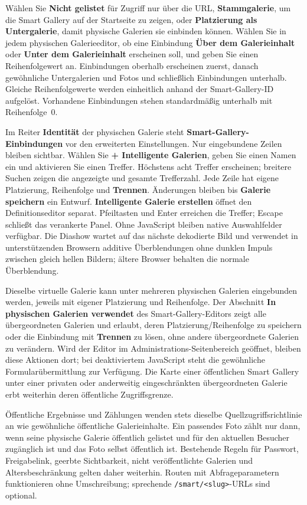 \documentclass[11pt,a4paper]{article}
\newcommand{\ui}[1]{\textbf{#1}}
\begin{document}
Wählen Sie \ui{Nicht gelistet} für Zugriff nur über die URL, \ui{Stammgalerie},
um die Smart Gallery auf der Startseite zu zeigen, oder \ui{Platzierung als
Untergalerie}, damit physische Galerien sie einbinden können. Wählen Sie in
jedem physischen Galerieeditor, ob eine Einbindung \ui{Über dem Galerieinhalt}
oder \ui{Unter dem Galerieinhalt} erscheinen soll, und geben Sie einen
Reihenfolgewert an. Einbindungen oberhalb erscheinen zuerst, danach gewöhnliche
Untergalerien und Fotos und schließlich Einbindungen unterhalb. Gleiche
Reihenfolgewerte werden einheitlich anhand der Smart-Gallery-ID aufgelöst.
Vorhandene Einbindungen stehen standardmäßig unterhalb mit Reihenfolge~0.

Im Reiter \ui{Identität} der physischen Galerie steht
\ui{Smart-Gallery-Einbindungen} vor den erweiterten Einstellungen. Nur
eingebundene Zeilen
bleiben sichtbar. Wählen Sie \ui{+ Intelligente Galerien}, geben Sie einen Namen
ein und aktivieren Sie einen Treffer. Höchstens acht Treffer erscheinen;
breitere Suchen zeigen die angezeigte und gesamte Trefferzahl. Jede Zeile hat
eigene Platzierung,
Reihenfolge und \ui{Trennen}. Änderungen bleiben bis \ui{Galerie speichern}
ein Entwurf. \ui{Intelligente Galerie erstellen} öffnet den
Definitionseditor separat. Pfeiltasten und Enter erreichen die Treffer;
Escape schließt das verankerte Panel. Ohne JavaScript bleiben native
Auswahlfelder verfügbar. Die Diashow wartet auf das nächste dekodierte Bild
und verwendet in unterstützenden Browsern additive Überblendungen ohne dunklen
Impuls zwischen gleich hellen Bildern; ältere Browser behalten die normale
Überblendung.

Dieselbe virtuelle Galerie kann unter mehreren physischen Galerien eingebunden
werden, jeweils mit eigener Platzierung und Reihenfolge. Der Abschnitt \ui{In
physischen Galerien verwendet} des Smart-Gallery-Editors zeigt alle
übergeordneten Galerien und erlaubt, deren Platzierung/Reihenfolge zu speichern
oder die Einbindung mit \ui{Trennen} zu lösen, ohne andere übergeordnete
Galerien zu verändern. Wird der Editor im Administrations-Seitenbereich
geöffnet, bleiben diese Aktionen dort; bei deaktiviertem JavaScript steht die
gewöhnliche Formularübermittlung zur Verfügung. Die Karte einer öffentlichen
Smart Gallery unter einer privaten oder anderweitig eingeschränkten
übergeordneten Galerie erbt weiterhin deren öffentliche Zugriffsgrenze.

Öffentliche Ergebnisse und Zählungen wenden stets dieselbe
Quellzugriffsrichtlinie an wie gewöhnliche öffentliche Galerieinhalte. Ein
passendes Foto zählt nur dann, wenn seine physische Galerie öffentlich gelistet
und für den aktuellen Besucher zugänglich ist und das Foto selbst öffentlich
ist. Bestehende Regeln für Passwort, Freigabelink, geerbte Sichtbarkeit, nicht
veröffentlichte Galerien und Altersbeschränkung gelten daher weiterhin. Routen
mit Abfrageparametern funktionieren ohne Umschreibung; sprechende
\texttt{/smart/<slug>}-URLs sind optional.
\end{document}
